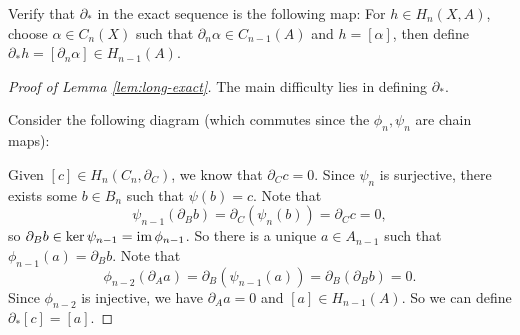 \begin{exercise}
  Verify that $\partial_*$ in the
  exact sequence is the following map:
  For $h \in H_n(X, A)$, choose $\alpha \in C_n(X)$
  such that $\partial_n \alpha \in C_{n - 1}(A)$
  and $h = [\alpha]$, then define
  $\partial_* h = [\partial_n \alpha] \in H_{n - 1}(A)$.
\end{exercise}

\begin{proof}[Proof of Lemma \ref{lem:long-exact}]
  The main difficulty lies in defining $\partial_*$.

  Consider the following diagram (which commutes since
  the $\phi_n, \psi_n$ are chain maps):
  \begin{center}
  \end{center}
  Given $[c] \in H_n(C_n, \partial_C)$, we know that
  $\partial_C c = 0$. Since $\psi_n$ is surjective,
  there exists some $b \in B_n$ such that
  $\psi(b) = c$. Note that
  \[
    \psi_{n - 1}(\partial_B b)
    = \partial_C(\psi_n(b))
    = \partial_C c = 0,
  \]
  so $\partial_B b \in \ker \psi_{n - 1} = \operatorname{im} \phi_{n - 1}$.
  So there is a unique $a \in A_{n - 1}$ such that
  $\phi_{n - 1}(a) = \partial_B b$. Note that
  \[
    \phi_{n - 2}(\partial_A a)
    = \partial_B (\psi_{n - 1} (a))
    = \partial_B (\partial_B b) = 0.
  \]
  Since $\phi_{n - 2}$ is injective, we have
  $\partial_{A} a = 0$ and $[a] \in H_{n - 1}(A)$.
  So we can define $\partial_*[c] = [a]$.


\end{proof}
